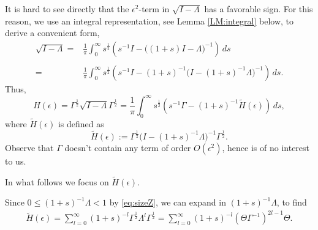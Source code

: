 \documentclass{article}
\numberwithin{equation}{section}
\begin{document}
It is hard to see directly that the $\epsilon^2$-term in $\sqrt{I-\Lambda}$ has a favorable sign. For this reason, we use an integral representation, see Lemma \ref{LM:integral} below, to derive a convenient form, 
\begin{align*}
\sqrt{I-\Lambda}
=& \frac{1}{\pi} \int_{0}^{\infty} s^{\frac{1}{2}} \left( s^{-1}I - \big(( 1+s)I-\Lambda\big)^{-1} \right)\, ds\\\\
=&\frac{1}{\pi} \int_{0}^{\infty} s^{\frac{1}{2}} \left( s^{-1}I - (1+s)^{-1}\big(I-(1+s)^{-1}\Lambda\big)^{-1} \right)\, ds.
\end{align*}
Thus,
\begin{equation}\label{eq:Dvare}
H( \epsilon)=\Gamma^{\frac{1}{2}} \sqrt{I-\Lambda} \Gamma^{\frac{1}{2}}=\frac{1}{\pi}\int_{0}^{\infty} s^{\frac{1}{2}} \left( s^{-1}\Gamma - (1+s)^{-1} \tilde{H}(\epsilon) \right)\, ds,
\end{equation} where $\tilde{H}(\epsilon)$ is defined as
\begin{equation}\label{def:tildeD}
\tilde{H}(\epsilon):=
\Gamma^{\frac{1}{2}}\big(I-(1+s)^{-1}\Lambda\big)^{-1}\Gamma^{\frac{1}{2}}.
\end{equation}
Observe that $\Gamma$ doesn't contain any term of order $O(\epsilon^2)$, hence is of no interest to us.

In what follows we focus on $\tilde{H}(\epsilon)$.


Since $0\leq (1+s)^{-1}\Lambda<1$ by \eqref{eq:sizeZ}, we can expand in $(1+s)^{-1}\Lambda$, to find
\begin{align}\label{eq:expZ}
    \tilde{H}(\epsilon)=\sum_{l=0}^{\infty} (1+s)^{-l} \Gamma^{\frac{1}{2}}\Lambda^l \Gamma^{\frac{1}{2}}=\sum_{l=0}^{\infty} (1+s)^{-l} (\Theta\Gamma^{-1})^{2l-1}\Theta.
\end{align} 
\end{document}
